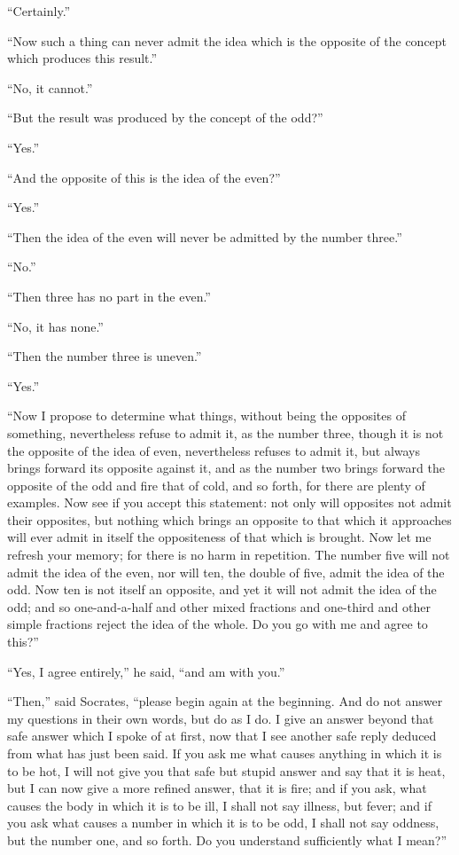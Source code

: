 \documentclass[letterpaper,12pt]{article}
\newcommand{\stephpag}[1]{\marginnote{\small\itshape\fontfamily{ppl}\selectfont #1}}
\begin{document}
\begin{drama}
``Certainly.''
 
``Now such a thing can never admit the idea which is the opposite of the concept which produces this result.''
 
``No, it cannot.''
 
``But the result was produced by the concept of the odd?''
 
``Yes.''
 
``And the opposite of this is the idea \stephpag{e} of the even?''
 
``Yes.''
 
``Then the idea of the even will never be admitted by the number three.''
 
``No.''
 
``Then three has no part in the even.''
 
``No, it has none.''
 
``Then the number three is uneven.''
 
``Yes.''
 
``Now I propose to determine what things, without being the opposites of something, nevertheless refuse to admit it, as the number three, though it is not the opposite of the idea of even, nevertheless refuses to admit it, but always brings forward its opposite against it, and \stephpag{105 a} as the number two brings forward the opposite of the odd and fire that of cold, and so forth, for there are plenty of examples. Now see if you accept this statement: not only will opposites not admit their opposites, but nothing which brings an opposite to that which it approaches will ever admit in itself the oppositeness of that which is brought. Now let me refresh your memory; for there is no harm in repetition. The number five will not admit the idea of the even, nor will ten, the double of five, admit the idea of the odd. Now ten is not itself an opposite, and yet it will not admit the idea of the odd; \stephpag{b} and so one-and-a-half and other mixed fractions and one-third and other simple fractions reject the idea of the whole. Do you go with me and agree to this?''
 
``Yes, I agree entirely,'' he said, ``and am with you.''
 
``Then,'' said Socrates, ``please begin again at the beginning. And do not answer my questions in their own words, but do as I do. I give an answer beyond that safe answer which I spoke of at first, now that I see another safe reply deduced from what has just been said. If you ask me what causes anything in which it is to be hot, I will not give \stephpag{c} you that safe but stupid answer and say that it is heat, but I can now give a more refined answer, that it is fire; and if you ask, what causes the body in which it is to be ill, I shall not say illness, but fever; and if you ask what causes a number in which it is to be odd, I shall not say oddness, but the number one, and so forth. Do you understand sufficiently what I mean?''
 

\end{drama}
\end{document}

